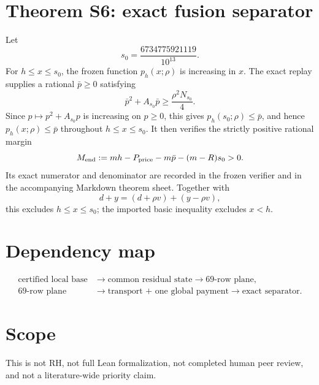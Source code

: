 \documentclass[11pt]{article}
\begin{document}
\section*{Theorem S6: exact fusion separator}
Let
\[
s_0=\frac{6734775921119}{10^{13}}.
\]
For $h\le x\le s_0$, the frozen function $p_h(x;\rho)$ is increasing in $x$.
The exact replay supplies a rational $\bar p\ge0$ satisfying
\[
\bar p^2+A_{s_0}\bar p\ge\frac{\rho^2N_{s_0}}4.
\]
Since $p\mapsto p^2+A_{s_0}p$ is increasing on $p\ge0$, this gives
$p_h(s_0;\rho)\le\bar p$, and hence $p_h(x;\rho)\le\bar p$ throughout $h\le x\le s_0$.
It then verifies the strictly positive rational margin
\[
M_{\rm end}:=mh-P_{\rm price}-m\bar p-(m-R)s_0>0.
\]
Its exact numerator and denominator are recorded in the frozen verifier and in the accompanying
Markdown theorem sheet. Together with
\[
d+y=(d+\rho v)+(y-\rho v),
\]
this excludes $h\le x\le s_0$; the imported basic inequality excludes $x<h$.

\section*{Dependency map}
\[
\begin{aligned}
\text{certified local base}&\longrightarrow\text{common residual state}\longrightarrow\text{69-row plane},\\
\text{69-row plane}&\longrightarrow\text{transport + one global payment}\longrightarrow\text{exact separator}.
\end{aligned}
\]

\section*{Scope}
This is not RH, not full Lean formalization, not completed human peer review, and not a
literature-wide priority claim.
\end{document}
